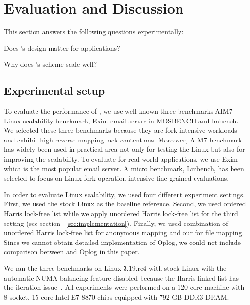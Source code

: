 \section{Evaluation and Discussion}
This section answers the following questions experimentally:

\begin{CompactItemize}
\item Does 's design matter for applications?

\item Why does 's scheme scale well?
\end{CompactItemize}




\subsection{Experimental setup}
To evaluate the performance of , we use well-known
three benchmarks:AIM7 Linux scalability benchmark, Exim email server in
MOSBENCH and lmbench.
We selected these three benchmarks because they are fork-intensive workloads and
exhibit high reverse mapping lock contentions.
Moreover, AIM7 benchmark has widely been used in practical area not only for testing the
Linux but also for improving the scalability. 
To evaluate  for real world
applications, we use Exim which is the most popular email server.
A micro benchmark, Lmbench, has been selected to focus on Linux fork operation-intensive
fine grained evaluations.

In order to evaluate Linux scalability, we used four different experiment
settings.
First, we used the stock Linux as the baseline reference. 
Second, we used ordered Harris lock-free list while 
we apply unordered Harris lock-free list for the third setting
(see section ~\ref{sec:implementation}). 
Finally, we used combination of unordered Harris lock-free list for anonymous mapping and
our  for file mapping.
Since we cannot obtain detailed implementation of Oplog, 
we could not include comparison between  and Oplog in this paper.

We ran the three benchmarks on Linux 3.19.rc4 with stock Linux with 
the automatic NUMA balancing feature disabled because the
Harris linked list has the iteration issue~\cite{petrank2013lock}. 
All experiments were performed on a 120 core machine with 8-socket, 15-core
Intel E7-8870 chips equipped with 792 GB DDR3 DRAM.

